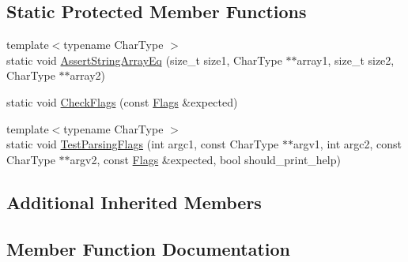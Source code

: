 \subsection*{Static Protected Member Functions}
\begin{DoxyCompactItemize}
\item 
{\footnotesize template$<$typename Char\+Type $>$ }\\static void \hyperlink{classtesting_1_1_init_google_test_test_af32acd91b1185c6868072009dce55a7b}{Assert\+String\+Array\+Eq} (size\+\_\+t size1, Char\+Type $\ast$$\ast$array1, size\+\_\+t size2, Char\+Type $\ast$$\ast$array2)
\item 
static void \hyperlink{classtesting_1_1_init_google_test_test_aac37d5d592202bf6614b02fe0b4da9d2}{Check\+Flags} (const \hyperlink{structtesting_1_1_flags}{Flags} \&expected)
\item 
{\footnotesize template$<$typename Char\+Type $>$ }\\static void \hyperlink{classtesting_1_1_init_google_test_test_add290338cf429308d0ab275ae4c46e69}{Test\+Parsing\+Flags} (int argc1, const Char\+Type $\ast$$\ast$argv1, int argc2, const Char\+Type $\ast$$\ast$argv2, const \hyperlink{structtesting_1_1_flags}{Flags} \&expected, bool should\+\_\+print\+\_\+help)
\end{DoxyCompactItemize}
\subsection*{Additional Inherited Members}


\subsection{Member Function Documentation}
